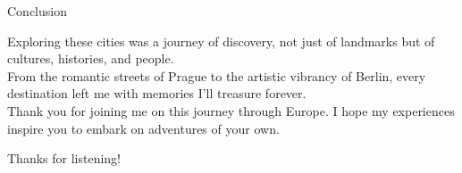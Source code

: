 \documentclass[aspectratio=169]{beamer}
\begin{document}
\begin{frame}{Conclusion}
    \begin{center}
        Exploring these cities was a journey of discovery, not just of landmarks but of cultures, histories, and people.\\
        From the romantic streets of Prague to the artistic vibrancy of Berlin, every destination left me with memories I’ll treasure forever.\\[1em]
        Thank you for joining me on this journey through Europe. I hope my experiences inspire you to embark on adventures of your own.
    \end{center}
\end{frame}


\begin{frame}[plain]
    \centering
    \Huge{Thanks for listening!}
\end{frame}
\end{document}
